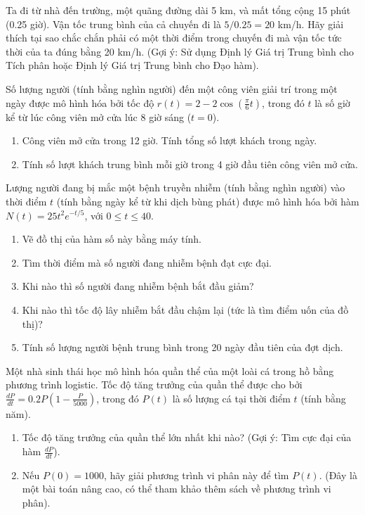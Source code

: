 \begin{exercise}
    Ta đi từ nhà đến trường, một quãng đường dài 5 km, và mất tổng cộng 15 phút (0.25 giờ). Vận tốc trung bình của cả chuyến đi là $5 / 0.25 = 20$ km/h. Hãy giải thích tại sao chắc chắn phải có một thời điểm trong chuyến đi mà vận tốc tức thời của ta đúng bằng 20 km/h. (Gợi ý: Sử dụng Định lý Giá trị Trung bình cho Tích phân hoặc Định lý Giá trị Trung bình cho Đạo hàm).
\end{exercise}

\begin{exercise}
    Số lượng người (tính bằng nghìn người) đến một công viên giải trí trong một ngày được mô hình hóa bởi tốc độ $r(t) = 2 - 2\cos\left(\frac{\pi}{6}t\right)$, trong đó $t$ là số giờ kể từ lúc công viên mở cửa lúc 8 giờ sáng ($t=0$).
    \begin{enumerate}[label=(\alph*)]
        \item Công viên mở cửa trong 12 giờ. Tính tổng số lượt khách trong ngày.
        \item Tính số lượt khách trung bình mỗi giờ trong 4 giờ đầu tiên công viên mở cửa.
    \end{enumerate}
\end{exercise}

\begin{exercise}
    Lượng người đang bị mắc một bệnh truyền nhiễm (tính bằng nghìn người) vào thời điểm $t$ (tính bằng ngày kể từ khi dịch bùng phát) được mô hình hóa bởi hàm $N(t) = 25 t^2 e^{-t/5}$, với $0 \le t \le 40$.
    \begin{enumerate}[label=(\alph*)]
        \item Vẽ đồ thị của hàm số này bằng máy tính.
        \item Tìm thời điểm mà số người đang nhiễm bệnh đạt cực đại.
        \item Khi nào thì số người đang nhiễm bệnh bắt đầu giảm?
        \item Khi nào thì tốc độ lây nhiễm bắt đầu chậm lại (tức là tìm điểm uốn của đồ thị)?
        \item Tính số lượng người bệnh trung bình trong 20 ngày đầu tiên của đợt dịch.
    \end{enumerate}
\end{exercise}

\begin{exercise}
    Một nhà sinh thái học mô hình hóa quần thể của một loài cá trong hồ bằng phương trình logistic. Tốc độ tăng trưởng của quần thể được cho bởi $\frac{dP}{dt} = 0.2P\left(1 - \frac{P}{5000}\right)$, trong đó $P(t)$ là số lượng cá tại thời điểm $t$ (tính bằng năm).
    \begin{enumerate}[label=(\alph*)]
        \item Tốc độ tăng trưởng của quần thể lớn nhất khi nào? (Gợi ý: Tìm cực đại của hàm $\frac{dP}{dt}$).
        \item Nếu $P(0) = 1000$, hãy giải phương trình vi phân này để tìm $P(t)$. (Đây là một bài toán nâng cao, có thể tham khảo thêm sách về phương trình vi phân).
    \end{enumerate}
\end{exercise}
